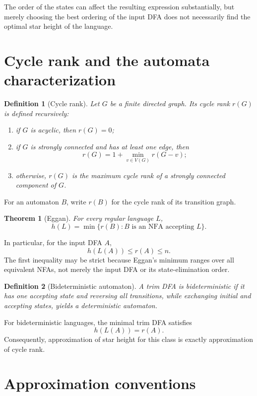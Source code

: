 \documentclass[11pt]{article}
\newtheorem{definition}{Definition}
\newtheorem{theorem}{Theorem}
\begin{document}
The order of the states can affect the resulting expression substantially,
but merely choosing the best ordering of the input DFA does not necessarily
find the optimal star height of the language.

\section{Cycle rank and the automata characterization}

\begin{definition}[Cycle rank]
Let $G$ be a finite directed graph. Its cycle rank $r(G)$ is defined
recursively:
\begin{enumerate}[label=(\roman*)]
  \item if $G$ is acyclic, then $r(G)=0$;
  \item if $G$ is strongly connected and has at least one edge, then
  \[
    r(G)=1+\min_{v\in V(G)}r(G-v);
  \]
  \item otherwise, $r(G)$ is the maximum cycle rank of a strongly connected
        component of $G$.
\end{enumerate}
\end{definition}

For an automaton $B$, write $r(B)$ for the cycle rank of its transition graph.

\begin{theorem}[Eggan]
For every regular language $L$,
\[
 h(L)=\min\{r(B):B\text{ is an NFA accepting }L\}.
\]
\end{theorem}

In particular, for the input DFA $A$,
\[
 h(L(A))\leq r(A)\leq n.
\]
The first inequality may be strict because Eggan's minimum ranges over all
equivalent NFAs, not merely the input DFA or its state-elimination order.

\begin{definition}[Bideterministic automaton]
A trim DFA is bideterministic if it has one accepting state and reversing all
transitions, while exchanging initial and accepting states, yields a
deterministic automaton.
\end{definition}

For bideterministic languages, the minimal trim DFA satisfies
\[
 h(L(A))=r(A).
\]
Consequently, approximation of star height for this class is exactly
approximation of cycle rank.

\section{Approximation conventions}
\end{document}
